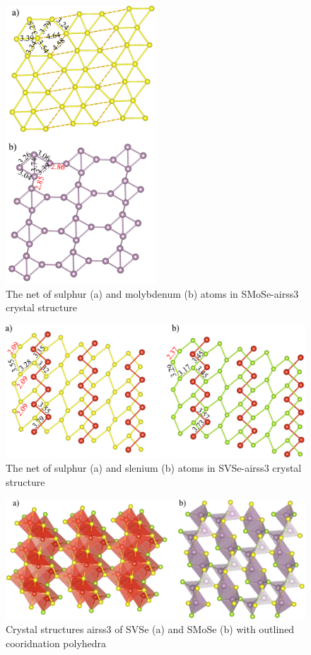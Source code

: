 \documentclass[a4paperm]{article}
\begin{document}
\begin{figure}[H]
	\includegraphics[width=0.5\textwidth]{airss3_smose.png}
	\caption{The net of sulphur (a) and molybdenum (b) atoms in SMoSe-airss3 crystal structure}
	\label{airss3_smose}
\end{figure}

\begin{figure}[H]
	\includegraphics[width=\textwidth]{airss3_S_Se.png}
	\caption{The net of sulphur (a) and slenium (b) atoms in SVSe-airss3 crystal structure}
	\label{airss3_S_Se}
\end{figure}

\begin{figure}[H]
	\includegraphics[width=\textwidth]{airss3_poly.png}
	\caption{Crystal structures airss3 of SVSe (a) and SMoSe (b) with outlined cooridnation polyhedra}
	\label{airss3_poly}
\end{figure}
\end{document}

